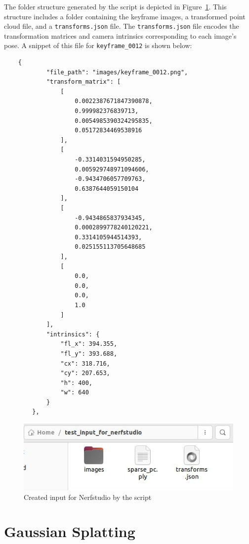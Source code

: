 The folder structure generated by the script is depicted in Figure~\ref{fig:Nerfstudio_input_by_my_script}. This structure includes a folder containing the keyframe images, a transformed point cloud file, and a \verb|transforms.json| file. The \verb|transforms.json| file encodes the transformation matrices and camera intrinsics corresponding to each image's pose. A snippet of this file for \verb|keyframe_0012| is shown below:

\begin{verbatim}
    {
            "file_path": "images/keyframe_0012.png",
            "transform_matrix": [
                [
                    0.0022387671847390878,
                    0.999982376839713,
                    0.0054985390324295835,
                    0.05172834469538916
                ],
                [
                    -0.3314031594950285,
                    0.005929748971094606,
                    -0.9434706057709763,
                    0.6387644059150104
                ],
                [
                    -0.9434865837934345,
                    0.0002899778240120221,
                    0.3314105944514393,
                    0.025155113705648685
                ],
                [
                    0.0,
                    0.0,
                    0.0,
                    1.0
                ]
            ],
            "intrinsics": {
                "fl_x": 394.355,
                "fl_y": 393.688,
                "cx": 318.716,
                "cy": 207.653,
                "h": 400,
                "w": 640
            }
        },
\end{verbatim}


\begin{figure}[htbp]
	\centering
	\includegraphics[width=150mm, keepaspectratio]{figures_jpg/Nerfstudio_input_by_my_script.jpg}
	\caption{Created input for Nerfstudio by the script}
	\label{fig:Nerfstudio_input_by_my_script}
\end{figure}

\FloatBarrier
\section{Gaussian Splatting}

